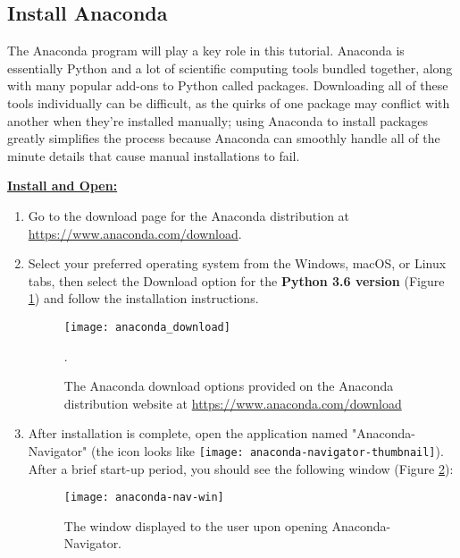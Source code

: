 \subsection{Install Anaconda}
The Anaconda program will play a key role in this tutorial. Anaconda is essentially Python and a lot of scientific computing tools bundled together, along with many popular add-ons to Python called packages.  Downloading all of these tools individually can be difficult, as the quirks of one package may conflict with another when they're installed manually; using Anaconda to install packages greatly simplifies the process because Anaconda can smoothly handle all of the minute details that cause manual installations to fail.

\textbf{\underline{Install and Open:}}

\begin{enumerate}
    \item Go to the download page for the Anaconda distribution at \\ \url{https://www.anaconda.com/download}. 
    \item Select your preferred operating system from the Windows, macOS, or Linux tabs, then select the Download option for the \textbf{Python 3.6 version} (Figure \ref{anaconda_download}) and follow the installation instructions.
    \begin{figure}[h]
        \begin{center}
        \texttt{[image: anaconda\_download]}
        \caption{The Anaconda download options provided on the Anaconda distribution website at \protect \url{https://www.anaconda.com/download}}.
        \label{anaconda_download}
        \end{center}
    \end{figure}


    \item After installation is complete, open the application named "Anaconda-Navigator" (the icon looks like \texttt{[image: anaconda-navigator-thumbnail]}). After a brief start-up period, you should see the following window (Figure \ref{anaconda-nav-win}):
    \begin{figure}[htbp]
        \begin{center}
        \texttt{[image: anaconda-nav-win]}
        \caption{The window displayed to the user upon opening Anaconda-Navigator.}
        \label{anaconda-nav-win}
        \end{center}
    \end{figure}
\end{enumerate}

